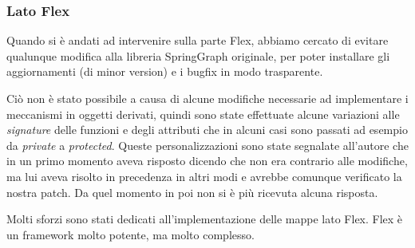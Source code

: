 \documentclass[a4wide,10pt,italian]{manual}
\begin{document}
\subsubsection{Lato Flex}

Quando si è andati ad intervenire sulla parte Flex,
abbiamo cercato di evitare qualunque modifica alla libreria SpringGraph originale,
per poter installare gli aggiornamenti (di minor version) e i bugfix in modo trasparente.

Ciò non è stato possibile a causa di alcune modifiche necessarie ad implementare i meccanismi
in oggetti derivati, quindi sono state effettuate alcune variazioni alle \emph{signature} delle funzioni
e degli attributi che in alcuni casi sono passati ad esempio da \emph{private} a \emph{protected}.
Queste personalizzazioni sono state segnalate all'autore che in un primo momento aveva risposto
dicendo che non era contrario alle modifiche, ma lui aveva risolto in precedenza in altri modi
e avrebbe comunque verificato la nostra patch. Da quel momento in poi non si è più ricevuta alcuna risposta.

Molti sforzi sono stati dedicati all'implementazione delle mappe lato Flex.
Flex è un framework molto potente, ma molto complesso.
\end{document}
